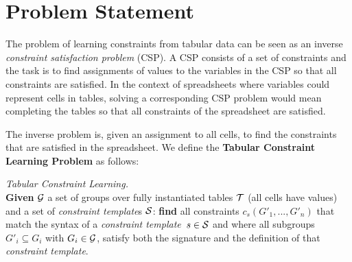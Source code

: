 \documentclass{sig-alternate-05-2015}
\newcommand{\sergey}[1]{\textcolor{magenta}{{\sc Sergey:} #1}\xspace}
\newcommand{\format}[1]{\textit{#1}\xspace}
\newcommand{\template}{\format{constraint template}}
\newcommand{\CSignature}{Signature\xspace}
\newcommand{\CFunction}{Definition\xspace}
\newcommand{\groups}{\ensuremath{\mathcal{G}}\xspace}
\begin{document}

\section{Problem Statement}
The problem of learning constraints from tabular data can be seen as an inverse {\em constraint satisfaction problem} (CSP). A CSP consists of a set of constraints and the
task is to find assignments of values to the variables in the CSP so that all constraints are satisfied.
In the context of spreadsheets where variables could represent cells in tables, solving a corresponding CSP problem would mean completing the tables so that all constraints of the spreadsheet are satisfied.

The inverse problem is, given an assignment to all cells, to find the constraints that are satisfied in the spreadsheet.
We define the {\bf Tabular Constraint Learning Problem} as follows:
%
\begin{definition} \textit{Tabular Constraint Learning.}\label{def:problem_statement}\\
{\bf   Given} ${\cal G}$ a set of groups over fully instantiated tables ${\cal T}$ (all cells have values) and a set of {\template}s ${\cal S}$: {\bf find } all constraints $c_s(G'_1, ..., G'_n)$ that match the syntax of a \template~$s \in {\cal S}$ and where all subgroups $G'_i \subseteq G_i$ with $G_i \in {\cal G}$, satisfy both the signature and the definition of that \template.
\end{definition}
\end{document}

